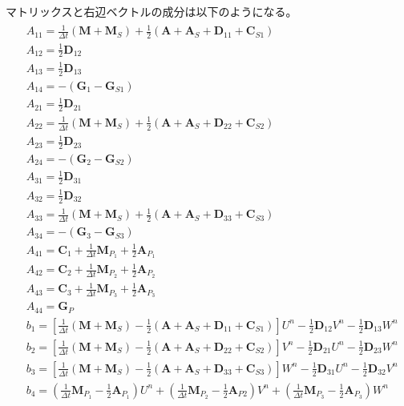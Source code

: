 マトリックスと右辺ベクトルの成分は以下のようになる。
\begin{equation}
	\begin{gathered}
		\begin{aligned} 
			&A_{11} = \frac{1}{\Delta t}\left(\bm{M}+\bm{M}_S\right)+\frac{1}{2}\left(\bm{A}+\bm{A}_S+\bm{D}_{11}+\bm{C}_{S1}\right) \\ 
			&A_{12} = \frac{1}{2} \bm{D}_{12} \\ 
			&A_{13} = \frac{1}{2} \bm{D}_{13} \\
			&A_{14} = -\left(\bm{G}_1-\bm{G}_{S 1}\right) \\
			&A_{21} = \frac{1}{2} \bm{D}_{21} \\ 
			&A_{22} = \frac{1}{\Delta t}\left(\bm{M}+\bm{M}_S\right)+\frac{1}{2}\left(\bm{A}+\bm{A}_S+\bm{D}_{22}+\bm{C}_{S2}\right) \\
			&A_{23} = \frac{1}{2} \bm{D}_{23} \\ 
			&A_{24} = -\left(\bm{G}_2-\bm{G}_{S 2}\right) \\
			&A_{31} = \frac{1}{2} \bm{D}_{31} \\
			&A_{32} = \frac{1}{2} \bm{D}_{32} \\
			&A_{33} = \frac{1}{\Delta t}\left(\bm{M}+\bm{M}_S\right)+\frac{1}{2}\left(\bm{A}+\bm{A}_S+\bm{D}_{33}+\bm{C}_{S3}\right) \\
			&A_{34} = -\left(\bm{G}_3-\bm{G}_{S 3}\right) \\
			&A_{41} = \bm{C}_1+\frac{1}{\Delta t} \bm{M}_{P_1}+\frac{1}{2} \bm{A}_{P_1} \\ 
			&A_{42} = \bm{C}_2+\frac{1}{\Delta t} \bm{M}_{P_2}+\frac{1}{2} \bm{A}_{P_2} \\ 
			&A_{43} = \bm{C}_3+\frac{1}{\Delta t} \bm{M}_{P_3}+\frac{1}{2} \bm{A}_{P_3} \\ 
			&A_{44} = \bm{G}_P \\ 
			&b_1 = \left[\frac{1}{\Delta t}\left(\bm{M}+\bm{M}_S\right)-\frac{1}{2}\left(\bm{A}+\bm{A}_S+\bm{D}_{11}+\bm{C}_{S1}\right)\right] U^n - \frac{1}{2} \bm{D}_{12} V^n - \frac{1}{2} \bm{D}_{13} W^n\\
			&b_2 = \left[\frac{1}{\Delta t}\left(\bm{M}+\bm{M}_S\right)-\frac{1}{2}\left(\bm{A}+\bm{A}_S+\bm{D}_{22}+\bm{C}_{S2}\right)\right] V^n - \frac{1}{2} \bm{D}_{21} U^n - \frac{1}{2} \bm{D}_{23} W^n\\ 
			&b_3 = \left[\frac{1}{\Delta t}\left(\bm{M}+\bm{M}_S\right)-\frac{1}{2}\left(\bm{A}+\bm{A}_S+\bm{D}_{33}+\bm{C}_{S3}\right)\right] W^n - \frac{1}{2} \bm{D}_{31} U^n - \frac{1}{2} \bm{D}_{32} V^n\\ 
			&b_4 = \left(\frac{1}{\Delta t} \bm{M}_{P_1} - \frac{1}{2} \bm{A}_{P_1}\right) U^n
			      +\left(\frac{1}{\Delta t} \bm{M}_{P_2} - \frac{1}{2} \bm{A}_{P 2}\right) V^n
			      +\left(\frac{1}{\Delta t} \bm{M}_{P_3} - \frac{1}{2} \bm{A}_{P_3}\right) W^n
		\end{aligned}
	\end{gathered}
\end{equation}

